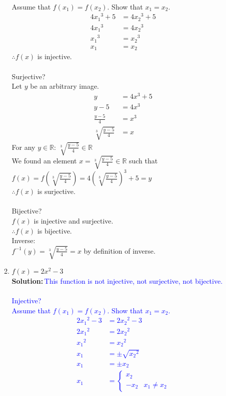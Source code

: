 \documentclass{article}
\newcommand{\sol}[1]{\textbf{Solution:\,}\textcolor{blue}{#1}}
\begin{document}
\begin{enumerate}
\begin{enumerate}
{\\Assume that $f(x_1)=f(x_2)$. Show that $x_1=x_2$.
\begin{align*}
4{x_1}^3 + 5&=4{x_2}^3 + 5&\text{}\\
4{x_1}^3&=4{x_2}^3&\text{}\\
{x_1}^3&={x_2}^3&\text{}\\
x_1&=x_2&\text{}
\end{align*}
$\therefore f(x)$ is injective.
\\\\Surjective?
\\Let $y$ be an arbitrary image.
\begin{align*}
y&=4x^3 + 5&\text{}\\
y-5&=4x^3&\text{}\\
\frac{y-5}{4}&=x^3&\text{}\\
\sqrt[3]{\frac{y-5}{4}}&=x&\text{}
\end{align*}
For any $y\in\mathbb{R}$: $\sqrt[3]{\frac{y-5}{4}}\in\mathbb{R}$
\\We found an element $x=\sqrt[3]{\frac{y-5}{4}}\in\mathbb{R}$ such that $f(x)=f(\sqrt[3]{\frac{y-5}{4}})=4(\sqrt[3]{\frac{y-5}{4}})^3 + 5=y$
\\$\therefore f(x)$ is surjective.
\\\\Bijective?
\\$f(x)$ is injective and surjective.
\\$\therefore f(x)$ is bijective.
\\Inverse:
\\$f^{-1}(y)=\sqrt[3]{\frac{y-5}{4}}=x$  by definition of inverse.
}\\
\item $f(x) = 2x^2-3$
\\\sol{This function is not injective, not surjective, not bijective.
\\\\Injective?
\\Assume that $f(x_1)=f(x_2)$. Show that $x_1=x_2$.
\begin{align*}
2{x_1}^2-3&=2{x_2}^2-3&\text{}\\
2{x_1}^2&=2{x_2}^2&\text{}\\
{x_1}^2&={x_2}^2&\text{}\\
{x_1}&=\pm\sqrt{{x_2}^2}&\text{}\\
{x_1}&=\pm x_2&\text{}\\
x_1&=\begin{cases}x_2&\text{}\\-x_2&\text{$x_1\neq x_2$}\end{cases}

\end{align*}}
\end{enumerate}
\end{enumerate}
\end{document}
